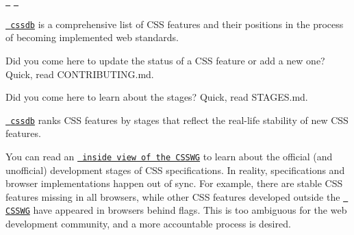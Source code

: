\href{https://www.npmjs.com/package/cssdb}{\texttt{ }} \href{https://github.com/csstools/cssdb/actions/workflows/test.yml}{\texttt{ }}

\href{https://github.com/csstools/cssdb}{\texttt{ cssdb}} is a comprehensive list of CSS features and their positions in the process of becoming implemented web standards.



Did you come here to update the status of a CSS feature or add a new one? Quick, read CONTRIBUTING.md.

Did you come here to learn about the stages? Quick, read STAGES.md.



\href{https://github.com/csstools/cssdb}{\texttt{ cssdb}} ranks CSS features by stages that reflect the real-\/life stability of new CSS features.

You can read an \href{https://fantasai.inkedblade.net/weblog/2011/inside-csswg/process}{\texttt{ inside view of the CSSWG}} to learn about the official (and unofficial) development stages of CSS specifications. In reality, specifications and browser implementations happen out of sync. For example, there are stable CSS features missing in all browsers, while other CSS features developed outside the \href{https://wiki.csswg.org/spec}{\texttt{ CSSWG}} have appeared in browsers behind flags. This is too ambiguous for the web development community, and a more accountable process is desired. 